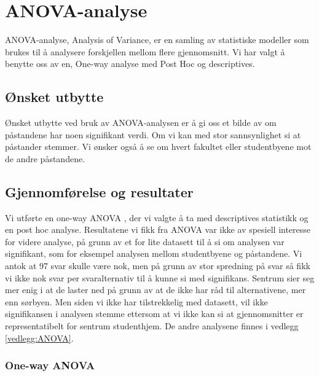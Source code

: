 \section{ANOVA-analyse}
ANOVA-analyse, Analysis of Variance, er en samling av statistiske modeller som brukes til å analysere forskjellen mellom flere gjennomsnitt. Vi har valgt å benytte oss av en, One-way analyse med Post Hoc og descriptives. 



\subsection{Ønsket utbytte}
Ønsket utbytte ved bruk av ANOVA-analysen er å gi oss et bilde av om påstandene har noen signifikant verdi. Om vi kan med stor sannsynlighet si at påstander stemmer. Vi ønsker også å se om hvert fakultet eller studentbyene mot de andre påstandene.


\subsection{Gjennomførelse og resultater}
Vi utførte en one-way ANOVA \cite{SPSSbok}, der vi valgte å ta med descriptives statistikk og en post hoc analyse. Resultatene vi fikk fra ANOVA var ikke av spesiell interesse for videre analyse, på grunn av et for lite datasett til å si om analysen var signifikant, som for eksempel analysen mellom studentbyene og påstandene. Vi antok at 97 svar skulle være nok, men på grunn av stor spredning på svar så fikk vi ikke nok svar per svaralternativ til å kunne si med signifikans. Sentrum sier seg mer enig i at de laster ned på grunn av at de ikke har råd til alternativene, mer enn sørbyen. Men siden vi ikke har tilstrekkelig med datasett, vil ikke signifikansen i analysen stemme ettersom at vi ikke kan si at gjennomsnitter er representatibelt for sentrum studenthjem. De andre analysene finnes i vedlegg \ref{vedlegg:ANOVA}.


\subsubsection{One-way ANOVA}

